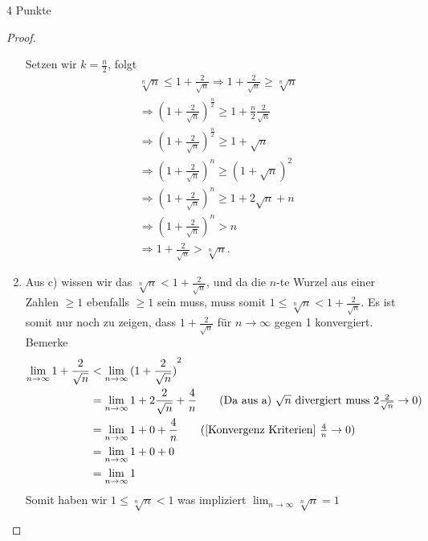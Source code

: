 \documentclass{problemset}
\begin{document}
\begin{problem}{4 Punkte}
\begin{proof}
\begin{enumerate}
		      Setzen wir $k = \frac{n}{2}$, folgt
		      \begin{align*}
			      \sqrt[n]{n} \leq 1 + \frac{2}{\sqrt{n}} \Longrightarrow 1 + \frac{2}{\sqrt{n}} \ge \sqrt[n]{n} \\
			      \Longrightarrow {(1 + \frac{2}{\sqrt{n}})}^{\frac{n}{2}} \ge 1 + \frac{n}{2}\frac{2}{\sqrt{n}} \\
			      \Longrightarrow {(1 + \frac{2}{\sqrt{n}})}^{\frac{n}{2}} \ge 1 + \sqrt{n}                      \\
			      \Longrightarrow {(1 + \frac{2}{\sqrt{n}})}^n \ge {(1 + \sqrt{n})}^{2}                          \\
			      \Longrightarrow {(1 + \frac{2}{\sqrt{n}})}^n \ge 1 + 2\sqrt{n} + n                             \\
			      \Longrightarrow {(1 + \frac{2}{\sqrt{n}})}^n > n                                               \\
			      \Longrightarrow 1 + \frac{2}{\sqrt{n}} > \sqrt[n]{n}.
		      \end{align*}
		      \checkmark
		\item Aus c) wissen wir das $\sqrt[n]{n} < 1 + \frac{2}{\sqrt{n}}$, und da die $n$-te Wurzel aus einer Zahlen $\ge 1$ ebenfalls $\ge 1$ sein muss, muss somit $1 \le \sqrt[n]{n} < 1 + \frac{2}{\sqrt{n}}$.
		      Es ist somit nur noch zu zeigen, dass $1 + \frac{2}{\sqrt{n}}$ für $n \to \infty$ gegen 1 konvergiert.
		      Bemerke
		      \begin{align*}
			      \lim_{n \to \infty} 1 + \frac{2}{\sqrt{n}} & < \lim_{n \to \infty} {( 1 + \frac{2}{\sqrt{n}})}^2                                                                                 \\
			                                                 & = \lim_{n \to \infty} 1 + 2\frac{2}{\sqrt{n}} + \frac{4}{n} \tag{Da aus a) $\sqrt{n}$ divergiert muss $ 2\frac{2}{\sqrt{n}} \to 0$} \\
			                                                 & = \lim_{n \to \infty} 1 + 0 + \frac{4}{n} \tag{[Konvergenz Kriterien] $\frac{4}{n} \to 0$}                                          \\
			                                                 & = \lim_{n \to \infty} 1 + 0 + 0                                                                                                     \\
			                                                 & = \lim_{n \to \infty} 1
		      \end{align*}
		      Somit haben wir $1 \le \sqrt[n]{n} < 1$ was impliziert $\lim_{n \to \infty} \sqrt[n]{n} = 1$
		      \checkmark
	\end{enumerate}
\end{proof}
\end{problem}
\end{document}
